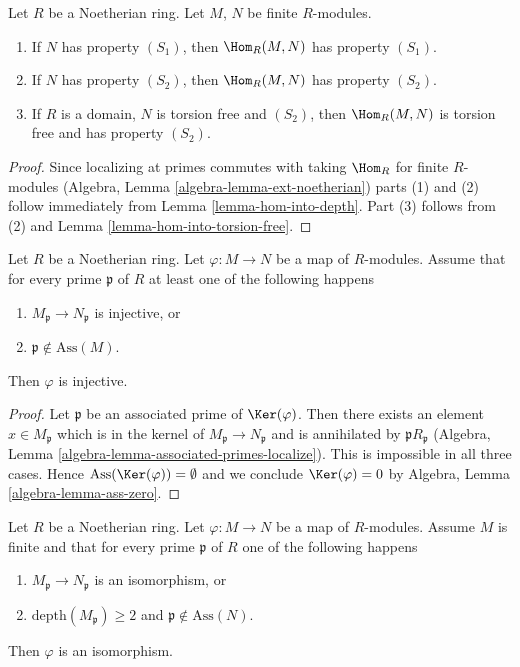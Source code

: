 \begin{lemma}
\label{lemma-hom-into-S2}
Let $R$ be a Noetherian ring. Let $M$, $N$ be finite $R$-modules.
\begin{enumerate}
\item If $N$ has property $(S_1)$, then $\Hom_R(M, N)$ has property $(S_1)$.
\item If $N$ has property $(S_2)$, then $\Hom_R(M, N)$ has property $(S_2)$.
\item If $R$ is a domain, $N$ is torsion free and $(S_2)$, then
$\Hom_R(M, N)$ is torsion free and has property $(S_2)$.
\end{enumerate}
\end{lemma}

\begin{proof}
Since localizing at primes commutes with taking $\Hom_R$ for finite
$R$-modules (Algebra, Lemma \ref{algebra-lemma-ext-noetherian})
parts (1) and (2) follow immediately from Lemma \ref{lemma-hom-into-depth}.
Part (3) follows from (2) and
Lemma \ref{lemma-hom-into-torsion-free}.
\end{proof}

\begin{lemma}
\label{lemma-check-injective-on-ass}
Let $R$ be a Noetherian ring. Let $\varphi : M \to N$ be a map of
$R$-modules. Assume that for every prime $\mathfrak p$
of $R$ at least one of the following happens
\begin{enumerate}
\item $M_\mathfrak p \to N_\mathfrak p$ is injective, or
\item $\mathfrak p \not \in \text{Ass}(M)$.
\end{enumerate}
Then $\varphi$ is injective.
\end{lemma}

\begin{proof}
Let $\mathfrak p$ be an associated prime of $\Ker(\varphi)$.
Then there exists an element $x \in M_\mathfrak p$ which is
in the kernel of $M_\mathfrak p \to N_\mathfrak p$ and is
annihilated by $\mathfrak pR_\mathfrak p$
(Algebra, Lemma \ref{algebra-lemma-associated-primes-localize}).
This is impossible in all three cases. Hence
$\text{Ass}(\Ker(\varphi)) = \emptyset$ and we conclude $\Ker(\varphi) = 0$ by
Algebra, Lemma \ref{algebra-lemma-ass-zero}.
\end{proof}

\begin{lemma}
\label{lemma-check-isomorphism-via-depth-and-ass}
Let $R$ be a Noetherian ring. Let $\varphi : M \to N$ be a map of
$R$-modules. Assume $M$ is finite and that for every prime $\mathfrak p$
of $R$ one of the following happens
\begin{enumerate}
\item $M_\mathfrak p \to N_\mathfrak p$ is an isomorphism, or
\item $\text{depth}(M_\mathfrak p) \geq 2$ and
$\mathfrak p \not \in \text{Ass}(N)$.
\end{enumerate}
Then $\varphi$ is an isomorphism.
\end{lemma}

